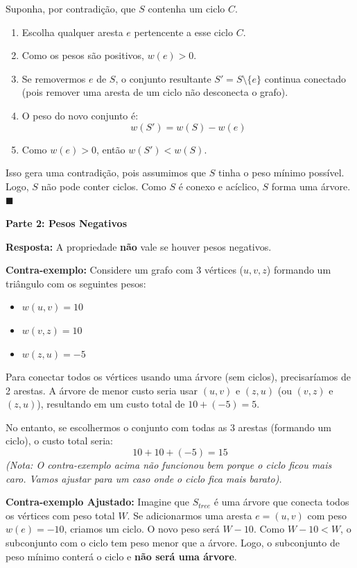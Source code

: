 \documentclass[a4paper,12pt]{article}
\begin{document}
Suponha, por contradição, que $S$ contenha um ciclo $C$.
\begin{enumerate}
    \item Escolha qualquer aresta $e$ pertencente a esse ciclo $C$.
    \item Como os pesos são positivos, $w(e) > 0$.
    \item Se removermos $e$ de $S$, o conjunto resultante $S' = S \setminus \{e\}$ continua conectado (pois remover uma aresta de um ciclo não desconecta o grafo).
    \item O peso do novo conjunto é:
    $$w(S') = w(S) - w(e)$$
    \item Como $w(e) > 0$, então $w(S') < w(S)$.
\end{enumerate}

Isso gera uma contradição, pois assumimos que $S$ tinha o peso mínimo possível. Logo, $S$ não pode conter ciclos. Como $S$ é conexo e acíclico, $S$ forma uma árvore. $\blacksquare$

\vspace{0.5cm}

\textbf{Parte 2: Pesos Negativos}

\textbf{Resposta:} A propriedade \textbf{não} vale se houver pesos negativos.

\textbf{Contra-exemplo:}
Considere um grafo com 3 vértices ($u, v, z$) formando um triângulo com os seguintes pesos:
\begin{itemize}
    \item $w(u, v) = 10$
    \item $w(v, z) = 10$
    \item $w(z, u) = -5$
\end{itemize}

Para conectar todos os vértices usando uma árvore (sem ciclos), precisaríamos de 2 arestas. A árvore de menor custo seria usar $(u, v)$ e $(z, u)$ (ou $(v, z)$ e $(z, u)$), resultando em um custo total de $10 + (-5) = 5$.

No entanto, se escolhermos o conjunto com todas as 3 arestas (formando um ciclo), o custo total seria:
$$10 + 10 + (-5) = 15$$
\textit{(Nota: O contra-exemplo acima não funcionou bem porque o ciclo ficou mais caro. Vamos ajustar para um caso onde o ciclo fica mais barato).}

\textbf{Contra-exemplo Ajustado:}
Imagine que $S_{tree}$ é uma árvore que conecta todos os vértices com peso total $W$.
Se adicionarmos uma aresta $e=(u, v)$ com peso $w(e) = -10$, criamos um ciclo.
O novo peso será $W - 10$.
Como $W - 10 < W$, o subconjunto com o ciclo tem peso menor que a árvore. Logo, o subconjunto de peso mínimo conterá o ciclo e \textbf{não será uma árvore}.
\end{document}
